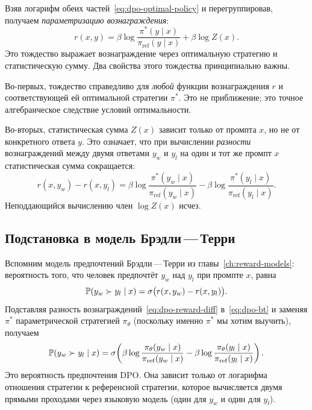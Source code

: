 Взяв логарифм обеих частей~\eqref{eq:dpo-optimal-policy} и перегруппировав, получаем \emph{параметризацию вознаграждения}:
\begin{equation}
\label{eq:dpo-reparam}
r(x, y) = \beta\log\frac{\pi^*(y \mid x)}{\pi_\mathrm{ref}(y \mid x)} + \beta\log Z(x).
\end{equation}
Это тождество выражает вознаграждение через оптимальную стратегию и статистическую сумму. Два свойства этого тождества принципиально важны.

Во-первых, тождество справедливо для \emph{любой} функции вознаграждения $r$ и соответствующей ей оптимальной стратегии $\pi^*$. Это не приближение; это точное алгебраическое следствие условий оптимальности.

Во-вторых, статистическая сумма $Z(x)$ зависит только от промпта $x$, но не от конкретного ответа $y$. Это означает, что при вычислении \emph{разности} вознаграждений между двумя ответами $y_w$ и $y_l$ на один и тот же промпт $x$ статистическая сумма сокращается:
\begin{equation}
\label{eq:dpo-reward-diff}
r(x, y_w) - r(x, y_l)
= \beta\log\frac{\pi^*(y_w \mid x)}{\pi_\mathrm{ref}(y_w \mid x)}
- \beta\log\frac{\pi^*(y_l \mid x)}{\pi_\mathrm{ref}(y_l \mid x)}.
\end{equation}
Неподдающийся вычислению член $\log Z(x)$ исчез.

\subsection{Подстановка в модель Брэдли\,---\,Терри}

Вспомним модель предпочтений Брэдли\,---\,Терри из главы~\ref{ch:reward-models}: вероятность того, что человек предпочтёт $y_w$ над $y_l$ при промпте $x$, равна
\begin{equation}
\label{eq:dpo-bt}
\mathbb{P}(y_w \succ y_l \mid x) = \sigma\bigl(r(x, y_w) - r(x, y_l)\bigr).
\end{equation}
Подставляя разность вознаграждений~\eqref{eq:dpo-reward-diff} в~\eqref{eq:dpo-bt} и заменяя $\pi^*$ параметрической стратегией $\pi_\theta$ (поскольку именно $\pi^*$ мы хотим выучить), получаем
\begin{equation}
\label{eq:dpo-pref-prob}
\mathbb{P}(y_w \succ y_l \mid x) = \sigma\!\left(\beta\log\frac{\pi_\theta(y_w \mid x)}{\pi_\mathrm{ref}(y_w \mid x)}
- \beta\log\frac{\pi_\theta(y_l \mid x)}{\pi_\mathrm{ref}(y_l \mid x)}\right).
\end{equation}
Это вероятность предпочтения DPO. Она зависит только от логарифма отношения стратегии к референсной стратегии, которое вычисляется двумя прямыми проходами через языковую модель (один для $y_w$ и один для $y_l$).

